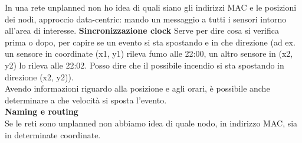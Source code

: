 \documentclass[12pt,italian]{report}
\begin{document}
In una rete unplanned non ho idea di quali siano gli indirizzi MAC e le posizioni dei nodi, approccio data-centric: mando un messaggio a tutti i sensori intorno all'area di interesse. 
\bigbreak
\noindent\textbf{Sincronizzazione clock}
\bigbreak
Serve per dire cosa si verifica prima o dopo, per capire se un evento si sta spostando e in che direzione (ad ex. un sensore in coordinate (x1, y1) rileva fumo alle 22:00, un altro sensore in (x2, y2) lo rileva alle 22:02. Posso dire che il possibile incendio si sta spostando in direzione (x2, y2)). \\
Avendo informazioni riguardo alla posizione e agli orari, è possibile anche determinare a che velocità si sposta l'evento. \\
\bigbreak
\noindent \textbf{Naming e routing} \\
Se le reti sono unplanned non abbiamo idea di quale nodo, in indirizzo MAC, sia in determinate coordinate. 
\end{document}
